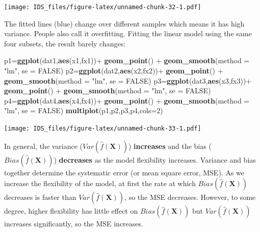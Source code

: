 \documentclass[12pt,]{krantz}
\newenvironment{Shaded}{\begin{snugshade}}{\end{snugshade}}
\newcommand{\KeywordTok}[1]{\textcolor[rgb]{0.13,0.29,0.53}{\textbf{{#1}}}}
\newcommand{\DataTypeTok}[1]{\textcolor[rgb]{0.13,0.29,0.53}{{#1}}}
\newcommand{\DecValTok}[1]{\textcolor[rgb]{0.00,0.00,0.81}{{#1}}}
\newcommand{\StringTok}[1]{\textcolor[rgb]{0.31,0.60,0.02}{{#1}}}
\newcommand{\OtherTok}[1]{\textcolor[rgb]{0.56,0.35,0.01}{{#1}}}
\newcommand{\NormalTok}[1]{{#1}}
\theoremstyle{definition}
\theoremstyle{definition}
\theoremstyle{remark}
\begin{document}
\texttt{[image: IDS\_files/figure-latex/unnamed-chunk-32-1.pdf]}

The fitted lines (blue) change over different samples which means it has
high variance. People also call it overfitting. Fitting the linear model
using the same four subsets, the result barely changes:

\begin{Shaded}
\begin{Highlighting}[]
\NormalTok{p1=}\KeywordTok{ggplot}\NormalTok{(dat1,}\KeywordTok{aes}\NormalTok{(x1,fx1))+}\StringTok{ }
\StringTok{  }\KeywordTok{geom_point}\NormalTok{() +}
\StringTok{  }\KeywordTok{geom_smooth}\NormalTok{(}\DataTypeTok{method =} \StringTok{"lm"}\NormalTok{, }\DataTypeTok{se =} \OtherTok{FALSE}\NormalTok{)}
\NormalTok{p2=}\KeywordTok{ggplot}\NormalTok{(dat2,}\KeywordTok{aes}\NormalTok{(x2,fx2))+}\StringTok{ }
\StringTok{  }\KeywordTok{geom_point}\NormalTok{() +}
\StringTok{  }\KeywordTok{geom_smooth}\NormalTok{(}\DataTypeTok{method =} \StringTok{"lm"}\NormalTok{, }\DataTypeTok{se =} \OtherTok{FALSE}\NormalTok{)}
\NormalTok{p3=}\KeywordTok{ggplot}\NormalTok{(dat3,}\KeywordTok{aes}\NormalTok{(x3,fx3))+}\StringTok{ }
\StringTok{  }\KeywordTok{geom_point}\NormalTok{() +}
\StringTok{  }\KeywordTok{geom_smooth}\NormalTok{(}\DataTypeTok{method =} \StringTok{"lm"}\NormalTok{, }\DataTypeTok{se =} \OtherTok{FALSE}\NormalTok{)}
\NormalTok{p4=}\KeywordTok{ggplot}\NormalTok{(dat4,}\KeywordTok{aes}\NormalTok{(x4,fx4))+}\StringTok{ }
\StringTok{  }\KeywordTok{geom_point}\NormalTok{() +}
\StringTok{  }\KeywordTok{geom_smooth}\NormalTok{(}\DataTypeTok{method =} \StringTok{"lm"}\NormalTok{, }\DataTypeTok{se =} \OtherTok{FALSE}\NormalTok{)}
\KeywordTok{multiplot}\NormalTok{(p1,p2,p3,p4,}\DataTypeTok{cols=}\DecValTok{2}\NormalTok{)}
\end{Highlighting}
\end{Shaded}

\texttt{[image: IDS\_files/figure-latex/unnamed-chunk-33-1.pdf]}

In general, the variance (\(Var(\hat{f}(\mathbf{X}))\))
\textbf{increases} and the bias (\(Bias(\hat{f}(\mathbf{X}))\))
\textbf{decreases} as the model flexibility increases. Variance and bias
together determine the systematic error (or mean square error, MSE). As
we increase the flexibility of the model, at first the rate at which
\(Bias(\hat{f}(\mathbf{X}))\) decreases is faster than
\(Var (\hat{f} (\mathbf{X}))\), so the MSE decreases. However, to some
degree, higher flexibility has little effect on
\(Bias(\hat{f}(\mathbf{X}))\) but \(Var(\hat{f} (\mathbf{X}))\)
increases significantly, so the MSE increases.
\end{document}
